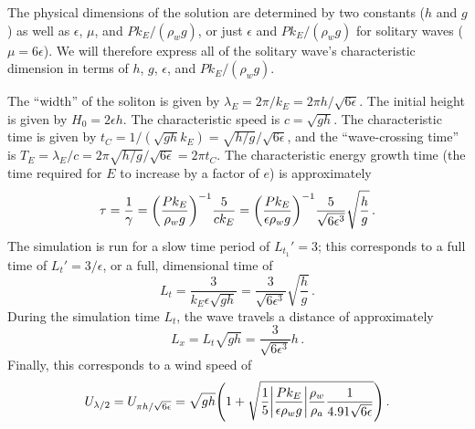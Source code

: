 \documentclass{jfm}
\begin{document}
The physical dimensions of the solution are determined by two constants
(\eg $h$ and $g$) as well as $\epsilon$, $\mu$, and $P k_E/(\rho_w g)$,
or just $\epsilon$ and $P k_E/(\rho_w g)$ for solitary waves ($\mu = 6
\epsilon$).
We will therefore express all of the solitary wave's characteristic
dimension in terms of $h$, $g$, $\epsilon$, and $P k_E/(\rho_w g)$.

The ``width'' of the soliton is given by $\lambda_E = 2 \pi/k_E = 2 \pi
h /\sqrt{6 \epsilon}$.
The initial height is given by $H_0 = 2 \epsilon h$.
The characteristic speed is $c = \sqrt{gh}$.
The characteristic time is given by $t_C = 1/(\sqrt{gh}k_E) =
\sqrt{h/g}/\sqrt{6 \epsilon}$, and the ``wave-crossing time'' is $T_E =
\lambda_E/c = 2 \pi \sqrt{h/g}/\sqrt{6 \epsilon} = 2 \pi t_C$.
The characteristic energy growth time (\ie the time required for $E$ to
increase by a factor of $e$) is approximately
\begin{equation}
  \tau = \frac{1}{\gamma} =
  \pqty{\frac{P k_E}{\rho_w g}}^{-1} \frac{5}{c k_E}
  = \pqty{\frac{P k_E}{\epsilon \rho_w g}}^{-1} \frac{5}{\sqrt{6
  \epsilon^3}} \sqrt{\frac{h}{g}} \,.
\end{equation}
The simulation is run for a slow time period of $L_{t_1}' = 3$; this
corresponds to a full time of $L_t' = 3/\epsilon$, or a full, dimensional
time of
\begin{equation}
  L_t = \frac{3}{k_E \epsilon \sqrt{gh}}
  = \frac{3}{\sqrt{6\epsilon^3}} \sqrt{\frac{h}{g}} \,.
\end{equation}
During the simulation time $L_t$, the wave travels a distance of
approximately
\begin{equation}
  L_x = L_t \sqrt{gh} = \frac{3}{\sqrt{6\epsilon^3}} h \,.
\end{equation}
Finally, this corresponds to a wind speed of
\begin{equation}
  U_{\lambda/2} = U_{\pi h/\sqrt{6 \epsilon}}
  = \sqrt{gh}\pqty{1 +
    \sqrt{\frac{1}{5} \abs{\frac{P k_E}{\epsilon \rho_w g}}
    \frac{\rho_w}{\rho_a} \frac{1}{4.91 \sqrt{6 \epsilon}}}} \,.
\end{equation}
\end{document}

